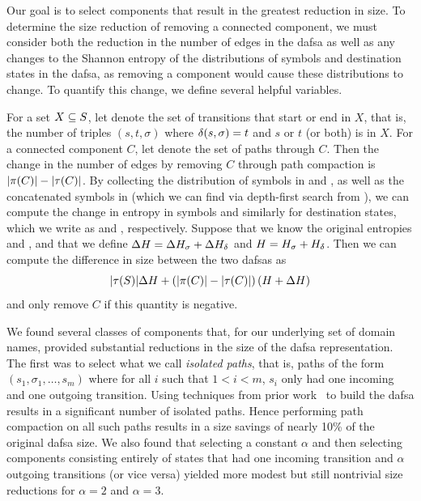 Our goal is to select components that result in the greatest reduction in size.
To determine the size reduction of removing a connected component, we must
consider both the reduction in the number of edges in the \ac{dafsa} as well as
any changes to the Shannon entropy of the distributions of symbols and
destination states in the \ac{dafsa}, as removing a component would cause these
distributions to change. To quantify this change, we define several helpful
variables.

For a set $X \subseteq S$, let  denote the set of transitions
that start or end in $X$, that is, the number of triples $(s, t, \sigma)$ where
$\delta(s, \sigma) = t$ and $s$ or $t$ (or both) is in $X$. For a connected
component $C$, let  denote the set of paths through $C$. Then the
change in the number of edges by removing $C$ through path compaction is
$|\pi(C)| - |\tau(C)|$. By collecting the distribution of symbols in
 and , as well as the concatenated symbols in
 (which we can find via depth-first search from ), we
can compute the change in entropy in symbols and similarly for destination
states, which we write as \symboldh and \destdh, respectively. Suppose that we know the
original entropies \symbolh and \desth, and that we define $\Delta H = \Delta H_\sigma +
\Delta H_\delta$ and $H = H_\sigma + H_\delta$. Then we can compute the difference in
size between the two \acp{dafsa} as
\begin{equation*}
  |\tau(S)| \Delta H + \left(|\pi(C)| - |\tau(C)|\right)
  (H + \Delta H)
\end{equation*}
and only remove $C$ if this quantity is negative.

We found several classes of components that, for our underlying set of domain
names, provided substantial reductions in the size of the \ac{dafsa}
representation. The first was to select what we call \emph{isolated paths}, that
is, paths of the form $(s_1, \sigma_1, \ldots, s_m)$ where for all $i$ such that
$1 < i < m$, $s_i$ only had one incoming and one outgoing transition. 
Using techniques from prior work~\cite{daciuk2000incremental} to build the \ac{dafsa} 
results in a significant number of isolated paths.
Hence performing path compaction on all such paths
results in a size savings of nearly 10\% of the original \ac{dafsa} size.
We also found that selecting a constant $\alpha$ and then selecting components
consisting entirely of states that had one incoming transition and $\alpha$
outgoing transitions (or vice versa) yielded more modest but still nontrivial
size reductions for $\alpha = 2$ and $\alpha = 3$. 

